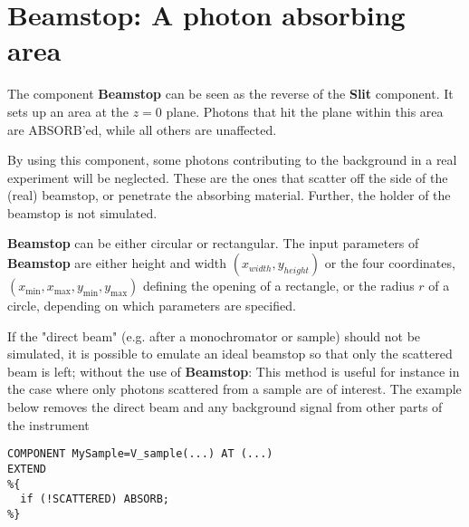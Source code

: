 \section{Beamstop: A photon absorbing area}
\label{beamstop}


The component \textbf{Beamstop} can be seen as the reverse of
the \textbf{Slit} component.
It sets up an area at the $z=0$ plane. Photons that hit the plane 
within this area are ABSORB'ed, while all others are unaffected.

By using this component, some photons contributing to the background
in a real experiment will be neglected.
These are the ones that scatter off the side
of the (real) beamstop, or penetrate the absorbing material.
Further, the holder of the beamstop is not simulated.

\textbf{Beamstop} can be either circular or rectangular.
The input parameters of \textbf{Beamstop} are either height and width $(x_{width},y_{height})$ or the four coordinates,
$(x_\mathrm{min}, x_\mathrm{max}, y_\mathrm{min}, y_\mathrm{max})$
defining the opening of a rectangle, or the radius $r$ of
a circle, depending on which parameters are specified.

If the "direct beam" (e.g. after a monochromator or sample) should not be
simulated, it is possible to emulate an ideal beamstop 
so that only the scattered beam is left;
without the use of \textbf{Beamstop}:
This method is useful for instance in the case where only photons 
scattered from a sample are of interest. 
The example below removes the direct beam and 
any background signal from other parts of the instrument
\begin{verbatim}
COMPONENT MySample=V_sample(...) AT (...)
EXTEND
%{
  if (!SCATTERED) ABSORB;
%}
\end{verbatim}
